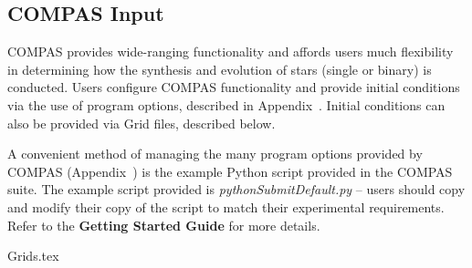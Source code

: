 \subsection{COMPAS Input}\label{sec:COMPASInput}

COMPAS provides wide-ranging functionality and affords users much flexibility in determining how the synthesis and evolution of stars (single or binary) is conducted.  Users configure COMPAS functionality and provide initial conditions via the use of program options, described in Appendix~. Initial conditions can also be provided via Grid files, described below.

A convenient method of managing the many program options provided by COMPAS (Appendix~) is the example Python script provided in the COMPAS suite. The example script provided is \textit{pythonSubmitDefault.py} -- users should copy and modify their copy of the script to match their experimental requirements. Refer to the \textbf{Getting Started Guide} for more details.


{Grids.tex}